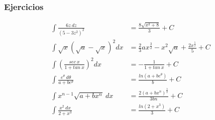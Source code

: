 \subsubsection{Ejercicios}
\begin{align}
	\int \frac{6z\:dz}{(5-3z^2)^2}&=\frac{8\sqrt{x^3+8}}{3}+C\\
	\int \sqrt x \left(\sqrt{a}-\sqrt{x}\right)^2dx&=\frac{2}{3}ax^{\frac{3}{2}}-x^2\sqrt{a}+\frac{2x^{\frac{5}{2}}}{5}+C\\
	\int \left(\frac{sec\:x}{1+tan\:x}\right)^2dx&=-\frac{1}{1+tan\:x}+C\\
	\int \frac{e^\theta\:d\theta}{a+be^\theta}&=\frac{ln(a+be^\theta)}{b}+C\\
	\int x^{n-1}\sqrt{a+bx^n}\:dx&=\frac{2(a+bx^n)^{\frac{3}{2}}}{3bn}+C\\
	\int \frac{x^2\:dx}{2+x^3}&=\frac{ln(2+x^3)}{3}+C
\end{align}